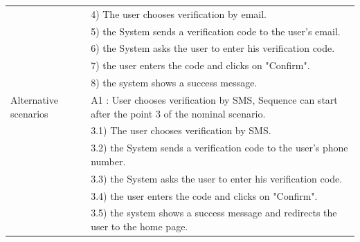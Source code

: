 \documentclass[]{uc2pfecaneva}
\begin{document}
\begin{table}[h]
\begin{tabularx}{\textwidth}{|l|X|}
            & 4) The user chooses verification by email.                                                                                                                           \\
            & 5) the System sends a verification code to the user's email.                                                                                                         \\
            & 6) the System asks the user to enter his verification code.                                                                                                          \\
            & 7) the user enters the code and clicks on "Confirm".                                                                                                                 \\
            & 8) the system shows a success message.                                                                                                                               \\ \hline
            Alternative scenarios
            & A1 : User chooses verification by SMS,  Sequence can start after the point 3 of the nominal scenario.                                                                \\
            & \hspace{4mm}3.1) The user chooses verification by SMS.                                                                                                               \\
            & \hspace{4mm}3.2) the System sends a verification code to the user's phone number.                                                                                    \\
            & \hspace{4mm}3.3) the System asks the user to enter his verification code.                                                                                            \\
            & \hspace{4mm}3.4) the user enters the code and clicks on "Confirm".                                                                                                   \\
            & \hspace{4mm}3.5) the system shows a success message and redirects the user to the home page.                                                                         \\ \hline

\end{tabularx}
\end{table}
\end{document}
